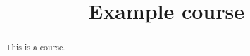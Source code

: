 \documentclass{xourse}
\title{Example course}
\begin{document}
\begin{abstract}
  This is a course.
\end{abstract}
\maketitle

\end{document}
